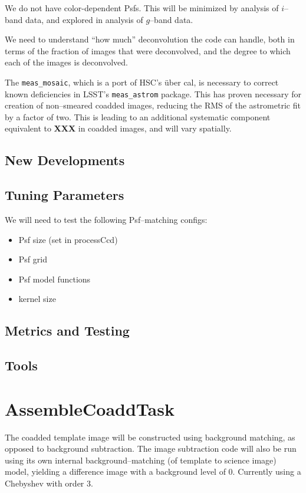 \documentclass[12pt]{article}
\begin{document}
We do not have color-dependent Psfs.  This will be minimized by
analysis of $i$--band data, and explored in analysis of $g$--band
data.

We need to understand ``how much'' deconvolution the code can handle,
both in terms of the fraction of images that were deconvolved, and the
degree to which each of the images is deconvolved.

The {\tt meas\_mosaic}, which is a port of HSC's \"{u}ber cal, is
necessary to correct known deficiencies in LSST's {\tt meas\_astrom}
package.  This has proven necessary for creation of non--smeared
coadded images, reducing the RMS of the astrometric fit by a factor of
two.  This is leading to an additional systematic component equivalent
to {\bf XXX} in coadded images, and will vary spatially.

\subsection{New Developments}

\subsection{Tuning Parameters}
We will need to test the following Psf--matching configs:
\begin{itemize}
\item Psf size (set in processCcd)
\item Psf grid 
\item Psf model functions
\item kernel size
\end{itemize}

\subsection{Metrics and Testing}

\subsection{Tools}


\clearpage 
\section{AssembleCoaddTask} 

The coadded template image will be constructed using background
matching, as opposed to background subtraction.  The image subtraction
code will also be run using its own internal background--matching (of
template to science image) model, yielding a difference image with a
background level of 0.  Currently using a Chebyshev with order 3.
\end{document}
